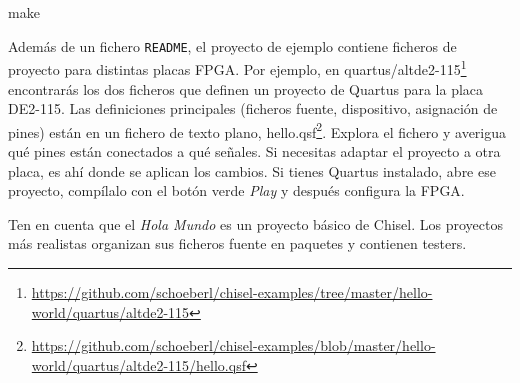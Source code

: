 \documentclass[%
    10pt,
    headinclude, footinclude=false,
    openright, %
    notitlepage,
    cleardoublepage=empty,
    headsepline,
    numbers=noenddot,
    bibliography=totoc, index=totoc,
    ]{scrbook}
\newcommand{\code}[1]{{\lstinline[basicstyle=\small\ttfamily]{#1}}}
\newcommand{\myref}[2]{\href{#1}{#2}}
\renewcommand{\myref}[2]{{#2}{\footnote{\url{#1}}}}
\begin{document}
\begin{chisel}
make
\end{chisel}


Además de un fichero \code{README}, el proyecto de ejemplo contiene ficheros de proyecto
para distintas placas FPGA. Por ejemplo, en
\myref{https://github.com/schoeberl/chisel-examples/tree/master/hello-world/quartus/altde2-115}{quartus/altde2-115}
encontrarás los dos ficheros que definen un proyecto de Quartus para la placa DE2-115.
Las definiciones principales (ficheros fuente, dispositivo, asignación de pines) están en un fichero de
texto plano,
\myref{https://github.com/schoeberl/chisel-examples/blob/master/hello-world/quartus/altde2-115/hello.qsf}{hello.qsf}.
Explora el fichero y averigua qué pines están conectados a qué señales.
Si necesitas adaptar el proyecto a otra placa, es ahí donde se aplican los cambios.
Si tienes Quartus instalado, abre ese proyecto, compílalo con el botón verde \emph{Play}
y después configura la FPGA.


Ten en cuenta que el \emph{Hola Mundo} es un proyecto básico de Chisel.
Los proyectos más realistas organizan sus ficheros fuente en paquetes y contienen testers.
\end{document}
